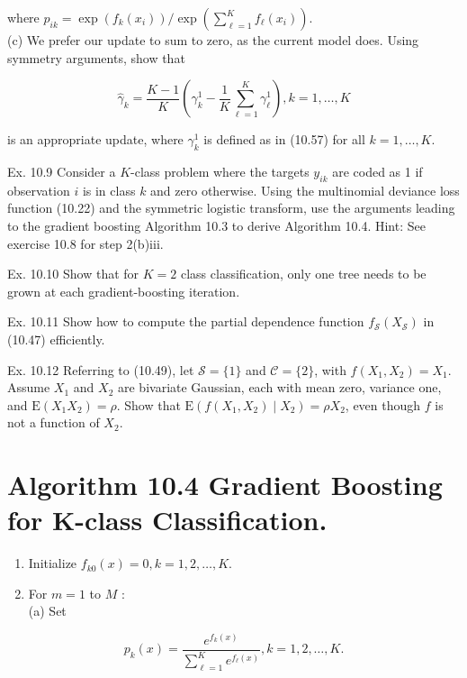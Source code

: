 \documentclass[10pt]{article}
\begin{document}
where $p_{i k}=\exp \left(f_{k}\left(x_{i}\right)\right) / \exp \left(\sum_{\ell=1}^{K} f_{\ell}\left(x_{i}\right)\right)$.\\
(c) We prefer our update to sum to zero, as the current model does. Using symmetry arguments, show that


\begin{equation*}
\hat{\gamma}_{k}=\frac{K-1}{K}\left(\gamma_{k}^{1}-\frac{1}{K} \sum_{\ell=1}^{K} \gamma_{\ell}^{1}\right), k=1, \ldots, K \tag{10.58}
\end{equation*}


is an appropriate update, where $\gamma_{k}^{1}$ is defined as in (10.57) for all $k=1, \ldots, K$.

Ex. 10.9 Consider a $K$-class problem where the targets $y_{i k}$ are coded as 1 if observation $i$ is in class $k$ and zero otherwise. Using the multinomial deviance loss function (10.22) and the symmetric logistic transform, use the arguments leading to the gradient boosting Algorithm 10.3 to derive Algorithm 10.4. Hint: See exercise 10.8 for step 2(b)iii.

Ex. 10.10 Show that for $K=2$ class classification, only one tree needs to be grown at each gradient-boosting iteration.

Ex. 10.11 Show how to compute the partial dependence function $f_{\mathcal{S}}\left(X_{\mathcal{S}}\right)$ in (10.47) efficiently.

Ex. 10.12 Referring to (10.49), let $\mathcal{S}=\{1\}$ and $\mathcal{C}=\{2\}$, with $f\left(X_{1}, X_{2}\right)= X_{1}$. Assume $X_{1}$ and $X_{2}$ are bivariate Gaussian, each with mean zero, variance one, and $\mathrm{E}\left(X_{1} X_{2}\right)=\rho$. Show that $\mathrm{E}\left(f\left(X_{1}, X_{2}\right) \mid X_{2}\right)=\rho X_{2}$, even though $f$ is not a function of $X_{2}$.

\section*{Algorithm 10.4 Gradient Boosting for K-class Classification.}
\begin{enumerate}
  \item Initialize $f_{k 0}(x)=0, k=1,2, \ldots, K$.
  \item For $m=1$ to $M$ :\\
(a) Set
\end{enumerate}

$$
p_{k}(x)=\frac{e^{f_{k}(x)}}{\sum_{\ell=1}^{K} e^{f_{\ell}(x)}}, k=1,2, \ldots, K .
$$
\end{document}
